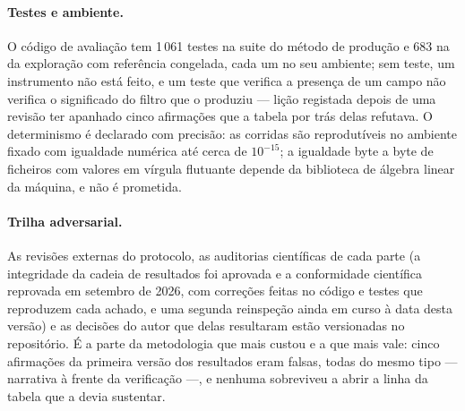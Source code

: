 \paragraph{Testes e ambiente.} O código de avaliação tem 1\,061 testes na
suite do método de produção e 683 na da exploração com referência
congelada, cada um no seu ambiente; sem teste, um instrumento não está
feito, e um teste que verifica a presença de um campo não verifica o
significado do filtro que o produziu --- lição registada depois de uma
revisão ter apanhado cinco afirmações que a tabela por trás delas refutava.
O determinismo é declarado com precisão: as corridas são reprodutíveis no
ambiente fixado com igualdade numérica até cerca de $10^{-15}$; a igualdade
byte a byte de ficheiros com valores em vírgula flutuante depende da
biblioteca de álgebra linear da máquina, e não é prometida.

\paragraph{Trilha adversarial.} As revisões externas do protocolo, as
auditorias científicas de cada parte (a integridade da cadeia de
resultados foi aprovada e a conformidade científica reprovada em setembro
de 2026, com correções feitas no código e testes que reproduzem cada
achado, e uma segunda reinspeção ainda em curso à data desta versão) e as
decisões do autor que delas resultaram estão versionadas no repositório.
É a parte da metodologia que
mais custou e a que mais vale: cinco afirmações da primeira versão dos
resultados eram falsas, todas do mesmo tipo --- narrativa à frente da
verificação ---, e nenhuma sobreviveu a abrir a linha da tabela que a
devia sustentar.
